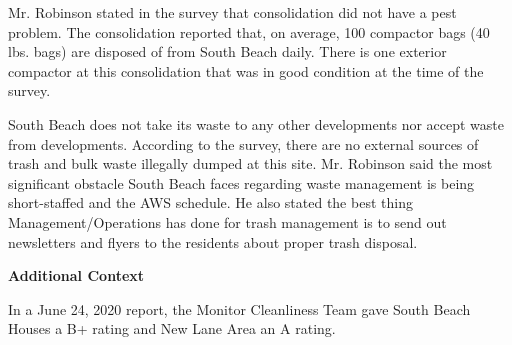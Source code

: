 Mr. Robinson stated in the survey that consolidation did not have a pest problem. The consolidation reported that, on average, 100 compactor bags (40 lbs. bags)  are disposed of from South Beach daily.  There is one exterior compactor at this consolidation that was in good condition at the time of the survey. 

South Beach does not take its waste to any other developments nor accept waste from developments. According to the survey, there are no external sources of trash and bulk waste illegally dumped at this site. Mr. Robinson said the most significant obstacle South Beach faces regarding waste management is being short-staffed and the AWS schedule. He also stated the best thing Management/Operations has done for trash management is to send out newsletters and flyers to the residents about proper trash disposal.  

\textbf{Additional Context}  

In a June 24, 2020 report, the Monitor Cleanliness Team gave South Beach Houses a B+ rating and New Lane Area an A rating.  

 
